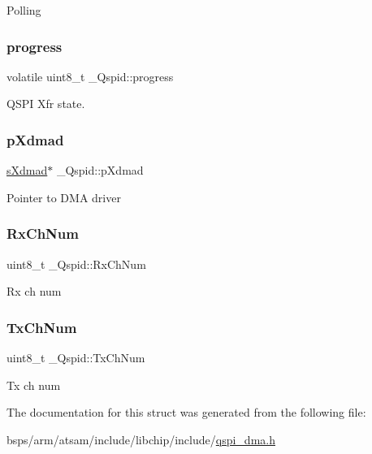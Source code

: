 Polling \mbox{\label{struct__Qspid_a210659a187b30298fb48d780d213ea5b}} 
\subsubsection{\texorpdfstring{progress}{progress}}
{\footnotesize\ttfamily volatile uint8\+\_\+t \+\_\+\+Qspid\+::progress}

Q\+S\+PI Xfr state. \mbox{\label{struct__Qspid_af9ef5832dfe4e497b557fbf2f28ca4ef}} 
\subsubsection{\texorpdfstring{pXdmad}{pXdmad}}
{\footnotesize\ttfamily \mbox{\hyperlink{group__dmad__structs_gaf2c13151514615a6beb35c0d868a5053}{s\+Xdmad}}$\ast$ \+\_\+\+Qspid\+::p\+Xdmad}

Pointer to D\+MA driver \mbox{\label{struct__Qspid_af9f0c7a2b41e938ff93a68afb0687afe}} 
\subsubsection{\texorpdfstring{RxChNum}{RxChNum}}
{\footnotesize\ttfamily uint8\+\_\+t \+\_\+\+Qspid\+::\+Rx\+Ch\+Num}

Rx ch num \mbox{\label{struct__Qspid_a238ab5f7d44fac7f416fe3118ee71a68}} 
\subsubsection{\texorpdfstring{TxChNum}{TxChNum}}
{\footnotesize\ttfamily uint8\+\_\+t \+\_\+\+Qspid\+::\+Tx\+Ch\+Num}

Tx ch num 

The documentation for this struct was generated from the following file\+:\begin{DoxyCompactItemize}
\item 
bsps/arm/atsam/include/libchip/include/\mbox{\hyperlink{qspi__dma_8h}{qspi\+\_\+dma.\+h}}\end{DoxyCompactItemize}
